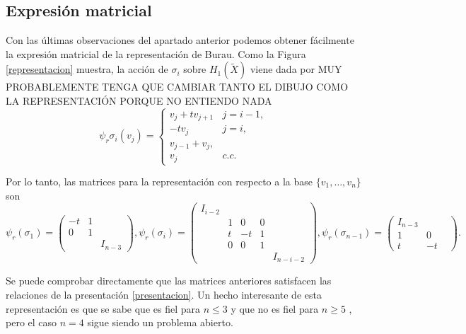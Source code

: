 \documentclass[TFG.tex]{subfiles}
\begin{document}

\subsection{Expresión matricial}
Con las últimas observaciones del apartado anterior podemos obtener fácilmente la expresión matricial de la representación de Burau. Como la Figura \ref{representacion} muestra, la acción de $\sigma_i$ sobre $H_1(\tilde{X})$ viene dada por
MUY PROBABLEMENTE TENGA QUE CAMBIAR TANTO EL DIBUJO COMO LA REPRESENTACIÓN PORQUE NO ENTIENDO NADA
\[
\psi_r\sigma_i(v_j)=\begin{cases}
v_j+tv_{j+1} & j=i-1,\\
-tv_j & j=i,\\
v_{j-1}+v_j,\\
v_j & c.c.
\end{cases}
\]

Por lo tanto, las matrices para la representación con respecto a la base $\{v_1,\dots, v_n\}$ son
\[
\psi_r(\sigma_1)=\begin{pmatrix}
-t & 1 & \\
0 & 1 & \\
& & I_{n-3}
\end{pmatrix},\psi_r(\sigma_i )=\begin{pmatrix}
I_{i-2} & & &\\
& 1 & 0 & 0 & \\
& t & -t & 1 & \\
& 0 & 0 & 1 & \\
& & & & I_{n-i-2}  
\end{pmatrix}, \psi_r(\sigma_{n-1})=\begin{pmatrix}
I_{n-3} & &\\
1 & 0 & \\
t & -t & 
\end{pmatrix}.
\]

Se puede comprobar directamente que las matrices anteriores satisfacen las relaciones de la presentación \ref{presentacion}. Un hecho interesante de esta representación es que se sabe que es fiel para $n\leq 3$ \cite{Birman} y que no es fiel para $n\geq 5$ \cite{Bil}\cite{LP}, pero el caso $n=4$ sigue siendo un problema abierto.
\end{document}
